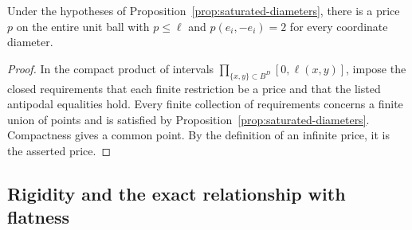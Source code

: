 \begin{corollary}
\label{cor:ball-price}
Under the hypotheses of Proposition~\ref{prop:saturated-diameters}, there
is a price $p$ on the entire unit ball with $p\le\ell$ and
$p(e_i,-e_i)=2$ for every coordinate diameter.
\end{corollary}
\begin{proof}
In the compact product of intervals
$\prod_{\{x,y\}\subset B^D}[0,\ell(x,y)]$, impose the closed requirements
that each finite restriction be a price and that the listed antipodal
equalities hold.  Every finite collection of requirements concerns a
finite union of points and is satisfied by
Proposition~\ref{prop:saturated-diameters}.  Compactness gives a common
point.  By the definition of an infinite price, it is the asserted price.
\end{proof}

\subsection{Rigidity and the exact relationship with flatness}

